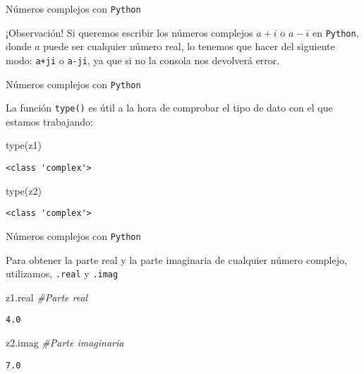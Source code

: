 \documentclass[
  ignorenonframetext,
]{beamer}
\newenvironment{Shaded}{\begin{snugshade}}{\end{snugshade}}
\newcommand{\BuiltInTok}[1]{#1}
\newcommand{\CommentTok}[1]{\textcolor[rgb]{0.56,0.35,0.01}{\textit{#1}}}
\newcommand{\NormalTok}[1]{#1}
\begin{document}
\begin{frame}[fragile]{Números complejos con \texttt{Python}}
\protect\hypertarget{nuxfameros-complejos-con-python-2}{}

¡Observación! Si queremos escribir los números complejos \(a+i\) o
\(a-i\) en \texttt{Python}, donde \(a\) puede ser cualquier número real,
lo tenemos que hacer del siguiente modo: \texttt{a+ji} o \texttt{a-ji},
ya que si no la consola nos devolverá error.

\end{frame}

\begin{frame}[fragile]{Números complejos con \texttt{Python}}
\protect\hypertarget{nuxfameros-complejos-con-python-3}{}

La función \texttt{type()} es útil a la hora de comprobar el tipo de
dato con el que estamos trabajando:

\begin{Shaded}
\begin{Highlighting}[]
\BuiltInTok{type}\NormalTok{(z1)}
\end{Highlighting}
\end{Shaded}

\begin{verbatim}
<class 'complex'>
\end{verbatim}

\begin{Shaded}
\begin{Highlighting}[]
\BuiltInTok{type}\NormalTok{(z2)}
\end{Highlighting}
\end{Shaded}

\begin{verbatim}
<class 'complex'>
\end{verbatim}

\end{frame}

\begin{frame}[fragile]{Números complejos con \texttt{Python}}
\protect\hypertarget{nuxfameros-complejos-con-python-4}{}

Para obtener la parte real y la parte imaginaria de cualquier número
complejo, utilizamos, \texttt{.real} y \texttt{.imag}

\begin{Shaded}
\begin{Highlighting}[]
\NormalTok{z1.real }\CommentTok{#Parte real}
\end{Highlighting}
\end{Shaded}

\begin{verbatim}
4.0
\end{verbatim}

\begin{Shaded}
\begin{Highlighting}[]
\NormalTok{z2.imag }\CommentTok{#Parte imaginaria}
\end{Highlighting}
\end{Shaded}

\begin{verbatim}
7.0
\end{verbatim}

\end{frame}
\end{document}
